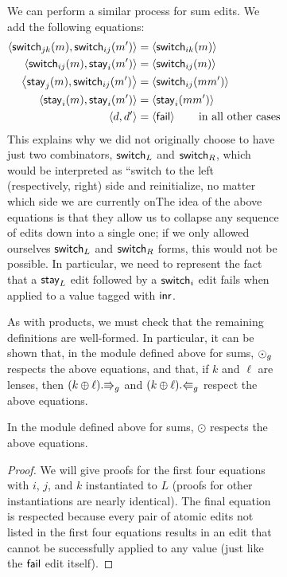 \begin{figure}
\begin{figure}
We can perform a similar process for sum edits. We add the following
equations:
\begin{align*}
    \left<\mathsf{switch}_{jk}(m),\mathsf{switch}_{ij}(m')\right>
        &= \left<\mathsf{switch}_{ik}(m)\right> \\
    \left<\mathsf{switch}_{ij}(m),\mathsf{stay}_i(m')\right>
        &= \left<\mathsf{switch}_{ij}(m)\right> \\
    \left<\mathsf{stay}_j(m),\mathsf{switch}_{ij}(m')\right>
        &= \left<\mathsf{switch}_{ij}(mm')\right> \\
    \left<\mathsf{stay}_i(m),\mathsf{stay}_i(m')\right>
        &= \left<\mathsf{stay}_i(mm')\right> \\
    \left< d, d'\right>
        &= \left<\mathsf{fail}\right> \qquad \mbox{in all other cases}
\end{align*}
This explains why we did not originally choose to have just two combinators,
$\mathsf{switch}_L$ and $\mathsf{switch}_R$, which would be interpreted as ``switch to
the left (respectively, right) side and reinitialize, no matter which side
we are currently on\dotquote The idea of the above equations is that they allow
us to collapse any sequence of edits down into a single one; if we only
allowed ourselves $\mathsf{switch}_L$ and $\mathsf{switch}_R$ forms, this would not be
possible. In particular, we need to represent the fact that a $\mathsf{stay}_L$
edit followed by a $\mathsf{switch}_i$ edit fails when applied to a value tagged
with $\mathsf{inr}$.

As with products, we must check that the remaining
definitions are well-formed.  \iffull\else In particular, it can be shown that,
in the module defined above for sums, $\odot_g$ respects the above
equations, and that, if $k$ and $\ell$ are lenses, then
$(k\oplus\ell).\mathord{\Rrightarrow}_g$ and $(k\oplus\ell).\mathord{\Lleftarrow}_g$ respect the above
equations.  \fi

\iffull
\begin{lemma}
    In the module defined above for sums, $\odot$ respects the above
    equations.
\end{lemma}
\begin{proof}
    We will give proofs for the first four equations with $i$, $j$, and $k$
    instantiated to $L$ (proofs for other instantiations are nearly
    identical). The final equation is respected because every pair of atomic
    edits not listed in the first four equations results in an edit that
    cannot be successfully applied to any value (just like the $\mathsf{fail}$ edit
    itself).


\end{proof}
\end{figure}
\end{figure}
